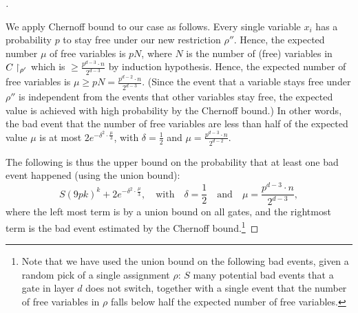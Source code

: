 \begin{proof}[]
\
\

We apply Chernoff bound to our case as follows.
Every single variable \( x_i \) has a probability \( p \) to stay free under our new restriction  \( \rho'' \).
Hence, the expected number $\mu$ of free variables is \( pN \), where $N$ is the number of (free) variables in $C\upharpoonright_{\rho'}$ which is $\ge \frac{p^{d-3} \cdot n}{2^{d-3}}$ by induction hypothesis. Hence, the expected number of free variables is $\mu\ge pN= \frac{p^{d-2} \cdot n}{2^{d-3}}$. 
(Since the event that a variable stays free under \( \rho'' \) is independent from the events that other variables stay free, the expected value is achieved with high probability by the Chernoff bound.)
 In other words, the bad event that the number of free variables are less than half of the expected value $\mu$ is at most $
2e^{-\delta^2 \cdot \frac{\mu}{3}}$, with $\delta = \frac{1}{2}$ and  $\mu = \frac{p^{d-3} \cdot n}{2^{d-2}}.$

The following is thus the upper bound on the probability that at least one bad event happened (using the union bound): 
\begin{equation}\label{eq:487:28}
 S(9pk)^k + 2e^{-\delta^2 \cdot \frac{\mu}{3}}, \quad \text{with} \quad \delta = \frac{1}{2} \quad \text{and} \quad \mu = \frac{p^{d-3} \cdot n}{2^{d-3}},
\end{equation}
where the left most term is by a union bound on all gates, and the rightmost term is the bad event estimated by the  Chernoff bound.\footnote{%
Note that we have used the union bound on the following bad events, given a random pick of a single assignment $\rho$: $S$ many potential bad events that a gate in layer $d$ does not switch, together with a single event that the number of free variables in $\rho$ falls below half the expected number of free variables.
}




\end{proof}
